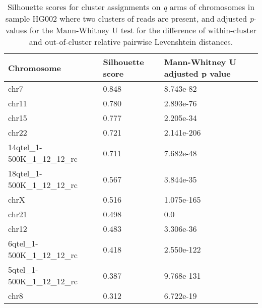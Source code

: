 \begin{samepage} \begin{table}[h!] \begin{tabular}{lll}
\hline
\textbf{Chromosome}             &  \textbf{Silhouette score}  &  \textbf{Mann-Whitney U adjusted p value}  \\  \hline
chr7                            &  0.848                      &  8.743e-82                                 \\
chr11                           &  0.780                      &  2.893e-76                                 \\
chr15                           &  0.777                      &  2.205e-34                                 \\
chr22                           &  0.721                      &  2.141e-206                                \\
14qtel\_1-500K\_1\_12\_12\_rc   &  0.711                      &  7.682e-48                                 \\
18qtel\_1-500K\_1\_12\_12\_rc   &  0.567                      &  3.844e-35                                 \\
chrX                            &  0.516                      &  1.075e-165                                \\
chr21                           &  0.498                      &  0.0                                       \\
chr12                           &  0.483                      &  3.306e-36                                 \\
6qtel\_1-500K\_1\_12\_12\_rc    &  0.418                      &  2.550e-122                                \\
5qtel\_1-500K\_1\_12\_12\_rc    &  0.387                      &  9.768e-131                                \\
chr8                            &  0.312                      &  6.722e-19                                 \\
\hline
\end{tabular}
\caption{Silhouette scores for cluster assignments on \textit{q} arms of chromosomes in sample HG002 where two clusters of reads are present, and adjusted \textit{p}-values for the Mann-Whitney U test for the difference of within-cluster and out-of-cluster relative pairwise Levenshtein distances.}
\label{tab:levenshtein-q_arm}
\end{table}
\end{samepage}
